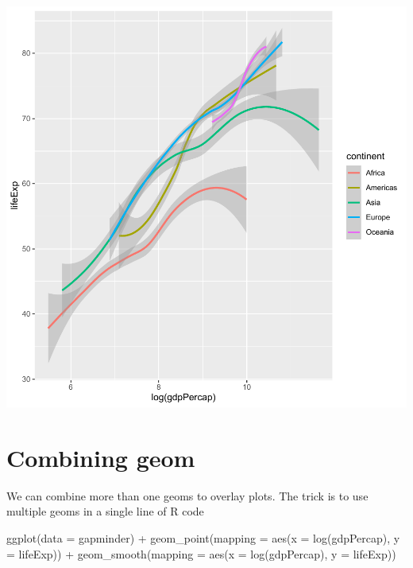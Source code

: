 \documentclass[
]{book}
\makeatletter
\newenvironment{Shaded}{\begin{snugshade}}{\end{snugshade}}
\newcommand{\AttributeTok}[1]{\textcolor[rgb]{0.61,0.61,0.61}{#1}}
\newcommand{\FunctionTok}[1]{\textcolor[rgb]{0,0,0}{#1}}
\newcommand{\NormalTok}[1]{#1}
\newcommand{\SpecialCharTok}[1]{\textcolor[rgb]{0,0,0}{#1}}
\newenvironment{kframe}{%
\medskip{}
\setlength{\fboxsep}{.8em}
 \def\at@end@of@kframe{}%
 \ifinner\ifhmode%
  \def\at@end@of@kframe{\end{minipage}}%
  \begin{minipage}{\columnwidth}%
 \fi\fi%
 \def\FrameCommand##1{\hskip\@totalleftmargin \hskip-\fboxsep
 \colorbox{shadecolor}{##1}\hskip-\fboxsep
     \hskip-\linewidth \hskip-\@totalleftmargin \hskip\columnwidth}%
 \MakeFramed {\advance\hsize-\width
   \@totalleftmargin\z@ \linewidth\hsize
   \@setminipage}}%
 {\par\unskip\endMakeFramed%
 \at@end@of@kframe}
\renewenvironment{Shaded}{\begin{kframe}}{\end{kframe}}
\makeatother
\begin{document}
\begin{center}\includegraphics[width=0.7\linewidth,keepaspectratio]{Multivariable_Data_Analysis_files/figure-latex/unnamed-chunk-28-1} \end{center}

\hypertarget{combining-geom}{%
\section{Combining geom}\label{combining-geom}}

We can combine more than one geoms to overlay plots. The trick is to use multiple geoms in a single line of R code

\begin{Shaded}
\begin{Highlighting}[]
\FunctionTok{ggplot}\NormalTok{(}\AttributeTok{data =}\NormalTok{ gapminder) }\SpecialCharTok{+}
  \FunctionTok{geom\_point}\NormalTok{(}\AttributeTok{mapping =} \FunctionTok{aes}\NormalTok{(}\AttributeTok{x =} \FunctionTok{log}\NormalTok{(gdpPercap), }\AttributeTok{y =}\NormalTok{ lifeExp)) }\SpecialCharTok{+}
  \FunctionTok{geom\_smooth}\NormalTok{(}\AttributeTok{mapping =} \FunctionTok{aes}\NormalTok{(}\AttributeTok{x =} \FunctionTok{log}\NormalTok{(gdpPercap), }\AttributeTok{y =}\NormalTok{ lifeExp))}
\end{Highlighting}
\end{Shaded}
\end{document}
